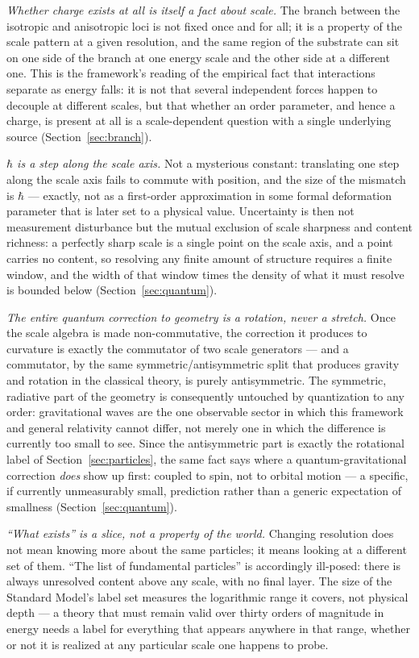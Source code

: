 \documentclass[pdflatex,sn-mathphys-num]{sn-jnl}
\theoremstyle{thmstyleone}
\theoremstyle{thmstylethree}
\theoremstyle{thmstyletwo}
\begin{document}
\emph{Whether charge exists at all is itself a fact about scale.} The
branch between the isotropic and anisotropic loci is not fixed once and
for all; it is a property of the scale pattern at a given resolution,
and the same region of the substrate can sit on one side of the branch
at one energy scale and the other side at a different one. This is the
framework's reading of the empirical fact that interactions separate as
energy falls: it is not that several independent forces happen to
decouple at different scales, but that whether an order parameter, and
hence a charge, is present at all is a scale-dependent question with a
single underlying source (Section~\ref{sec:branch}).

\emph{$\hbar$ is a step along the scale axis.} Not a mysterious
constant: translating one step along the scale axis fails to commute
with position, and the size of the mismatch is $\hbar$ — exactly, not as
a first-order approximation in some formal deformation parameter that is
later set to a physical value. Uncertainty is then not measurement
disturbance but the mutual exclusion of scale sharpness and content
richness: a perfectly sharp scale is a single point on the scale axis,
and a point carries no content, so resolving any finite amount of
structure requires a finite window, and the width of that window times
the density of what it must resolve is bounded below
(Section~\ref{sec:quantum}).

\emph{The entire quantum correction to geometry is a rotation, never a
stretch.} Once the scale algebra is made non-commutative, the correction
it produces to curvature is exactly the commutator of two scale
generators — and a commutator, by the same symmetric/antisymmetric split
that produces gravity and rotation in the classical theory, is purely
antisymmetric. The symmetric, radiative part of the geometry is
consequently untouched by quantization to any order: gravitational waves
are the one observable sector in which this framework and general
relativity cannot differ, not merely one in which the difference is
currently too small to see. Since the antisymmetric part is exactly the
rotational label of Section~\ref{sec:particles}, the same fact says where
a quantum-gravitational correction \emph{does} show up first: coupled to
spin, not to orbital motion — a specific, if currently unmeasurably
small, prediction rather than a generic expectation of smallness
(Section~\ref{sec:quantum}).

\emph{``What exists'' is a slice, not a property of the world.} Changing
resolution does not mean knowing more about the same particles; it means
looking at a different set of them. ``The list of fundamental
particles'' is accordingly ill-posed: there is always unresolved content
above any scale, with no final layer. The size of the Standard Model's
label set measures the logarithmic range it covers, not physical depth
— a theory that must remain valid over thirty orders of magnitude in
energy needs a label for everything that appears anywhere in that range,
whether or not it is realized at any particular scale one happens to
probe.
\end{document}
